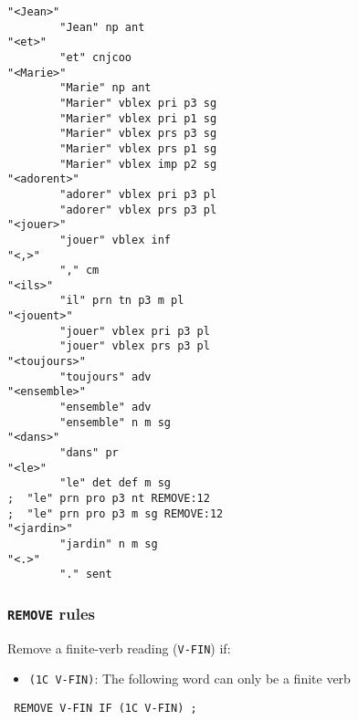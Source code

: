 \documentclass[10pt,xetex]{beamer} %
\begin{document}
\begin{frame}[fragile]

\begin{multicols}{2}
\begin{verbatim}
"<Jean>"
        "Jean" np ant
"<et>"
        "et" cnjcoo
"<Marie>"
        "Marie" np ant
        "Marier" vblex pri p3 sg
        "Marier" vblex pri p1 sg
        "Marier" vblex prs p3 sg
        "Marier" vblex prs p1 sg
        "Marier" vblex imp p2 sg
"<adorent>"
        "adorer" vblex pri p3 pl
        "adorer" vblex prs p3 pl
"<jouer>"
        "jouer" vblex inf
"<,>"
        "," cm
"<ils>"
        "il" prn tn p3 m pl
"<jouent>"
        "jouer" vblex pri p3 pl
        "jouer" vblex prs p3 pl
"<toujours>"
        "toujours" adv
"<ensemble>"
        "ensemble" adv
        "ensemble" n m sg
"<dans>"
        "dans" pr
"<le>"
        "le" det def m sg
;  "le" prn pro p3 nt REMOVE:12
;  "le" prn pro p3 m sg REMOVE:12
"<jardin>"
        "jardin" n m sg
"<.>"
        "." sent

\end{verbatim}
\end{multicols}

\end{frame}

\begin{frame}
  \frametitle{\texttt{REMOVE} rules}

Remove a finite-verb reading (\texttt{V-FIN}) if:

\begin{itemize}
  \item \texttt{(1C V-FIN)}: The following word can only be a finite verb
\end{itemize}

\pause
\begin{center}
\texttt{
REMOVE V-FIN IF (1C V-FIN) ;
}
\end{center}
\end{frame}
\end{document}
